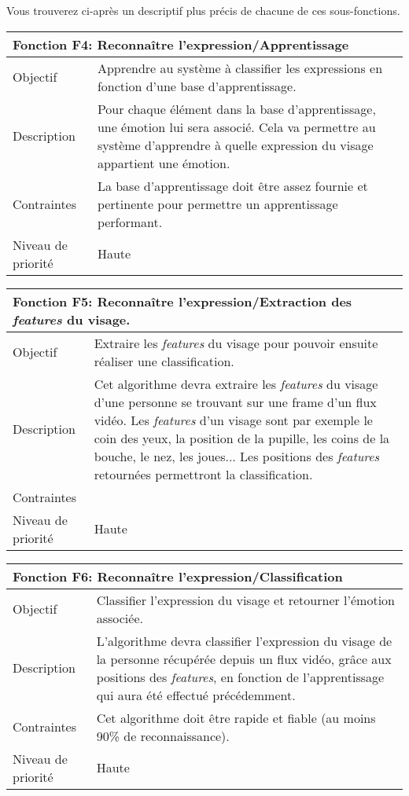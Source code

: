 \documentclass[poster]{polytech/polytech}
\begin{document}
Vous trouverez ci-après un descriptif plus précis de chacune de ces sous-fonctions.

\begin{tabular}{|l|p{12.5cm}|}
   \hline
   \multicolumn{2}{|l|}{\textbf{Fonction F4: Reconnaître l'expression/Apprentissage}} \\
   \hline
   Objectif &Apprendre au système à classifier les expressions en fonction d'une base d'apprentissage.\\
   \hline
   Description &Pour chaque élément dans la base d'apprentissage, une émotion lui sera associé. Cela va permettre au système d'apprendre à quelle expression du visage appartient une émotion.\\
   \hline
   Contraintes &La base d'apprentissage doit être assez fournie et pertinente pour permettre un apprentissage performant. \\
   \hline
   Niveau de priorité &Haute \\
   \hline
\end{tabular}

\begin{tabular}{|l|p{12.5cm}|}
   \hline
   \multicolumn{2}{|l|}{\textbf{Fonction F5: Reconnaître l'expression/Extraction des \textit{features} du visage.}} \\
   \hline
   Objectif &Extraire les \textit{features} du visage pour pouvoir ensuite réaliser une classification. \\
   \hline
   Description &Cet algorithme devra extraire les \textit{features} du visage d'une personne se trouvant sur une frame d'un flux vidéo. Les \textit{features} d'un visage sont par exemple le coin des yeux, la position de la pupille, les coins de la bouche, le nez, les joues... Les positions des \textit{features} retournées permettront la classification. \\
   \hline
   Contraintes & \\
   \hline
   Niveau de priorité &Haute \\
   \hline
\end{tabular}

\begin{tabular}{|l|p{12.5cm}|}
   \hline
   \multicolumn{2}{|l|}{\textbf{Fonction F6: Reconnaître l'expression/Classification}} \\
   \hline
   Objectif &Classifier l'expression du visage et retourner l'émotion associée. \\
   \hline
   Description &L'algorithme devra classifier l'expression du visage de la personne récupérée depuis un flux vidéo, grâce aux positions des \textit{features}, en fonction de l'apprentissage qui aura été effectué précédemment. \\
   \hline
   Contraintes &Cet algorithme doit être rapide et fiable (au moins 90\% de reconnaissance). \\
   \hline
   Niveau de priorité &Haute \\
   \hline
\end{tabular}
\end{document}
